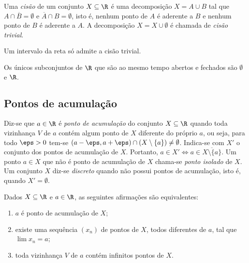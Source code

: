 \documentclass{article}
\begin{document}
\begin{defn}
    Uma \emph{cisão} de um conjunto \(X \subseteq \R\) é uma decomposição \(X = A \cup B\) tal que \(A \cap \overline{B} = \emptyset\) e \(\overline{A} \cap B = \emptyset\), isto é, nenhum ponto de \(A\) é aderente a \(B\) e nenhum ponto de \(B\) é aderente a \(A\).
    A decomposição \(X = X \cup \emptyset\) é chamada de \emph{cisão trivial}.
\end{defn}

\begin{prop}
    Um intervalo da reta só admite a cisão trivial.
\end{prop}

\begin{cor}
    Os únicos subconjuntos de \(\R\) que são ao mesmo tempo abertos e fechados são \(\emptyset\) e \(\R\).
\end{cor}

\subsection{Pontos de acumulação}

\begin{defn}
    Diz-se que \(a \in \R\) é \emph{ponto de acumulação} do conjunto \(X \subseteq \R\) quando toda vizinhança \(V\) de \(a\) contém algum ponto de \(X\) diferente do próprio \(a\), ou seja, para todo \(\eps > 0\) tem-se \((a-\eps, a+\eps) \cap (X \setminus \{a\}) \neq \emptyset\). Indica-se com \(X'\) o conjunto dos pontos de acumulação de \(X\). Portanto, \(a \in X' \iff a \in \overline{X \setminus \{a\}}\).
    Um ponto \(a \in X\) que não é ponto de acumulação de \(X\) chama-se \emph{ponto isolado} de \(X\). Um conjunto \(X\) diz-se \emph{discreto} quando não possui pontos de acumulação, isto é, quando \(X' = \emptyset\).
\end{defn}

\begin{thm} 
    Dados \(X \subseteq \R\) e \(a \in \R\), as seguintes afirmações são equivalentes:
    \begin{enumerate}
        \item [(i)] \(a\) é ponto de acumulação de \(X\);
        \item [(ii)] existe uma sequência \((x_n)\) de pontos de \(X\), todos diferentes de \(a\), tal que \(\lim x_n = a\);
        \item [(iii)] toda vizinhança \(V\) de \(a\) contém infinitos pontos de \(X\). 
    \end{enumerate}
\end{thm}
\end{document}

